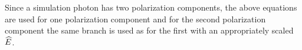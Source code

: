 Since a simulation photon has two polarization components, the above equations are used for one
polarization component and for the second polarization component the same branch is used as for the
first with an appropriately scaled $\widehat E$.

%
%


